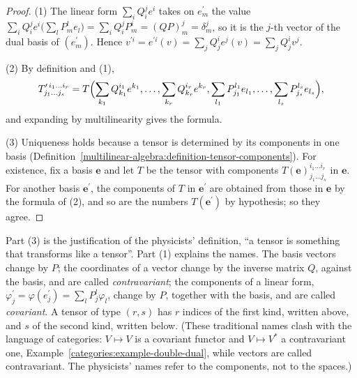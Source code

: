 \begin{proof}
(1) The linear form $\sum_iQ^j_ie^i$ takes on $e^{\prime}_m$ the value $\sum_iQ^j_ie^i\bigl(\sum_lP^l_me_l\bigr) = \sum_iQ^j_iP^i_m = (QP)^j_m = \delta^j_m$, so it is the $j$-th vector of the
dual basis of $(e^{\prime}_m)$. Hence $v^{\prime i} = e^{\prime i}(v) = \sum_jQ^i_je^j(v) = \sum_jQ^i_jv^j$.

(2) By definition and (1),
\[
T^{\prime\, i_1 \ldots i_r}_{j_1 \ldots j_s} = T\Bigl(\sum_{k_1}Q^{i_1}_{k_1}e^{k_1}, \ldots, \sum_{k_r}Q^{i_r}_{k_r}e^{k_r}, \sum_{l_1}P^{l_1}_{j_1}e_{l_1}, \ldots, \sum_{l_s}P^{l_s}_{j_s}e_{l_s}\Bigr),
\]
and expanding by multilinearity gives the formula.

(3) Uniqueness holds because a tensor is determined by its components in one basis (Definition~\ref{multilinear-algebra:definition-tensor-components}). For existence, fix a
basis $\mathbf{e}$ and let $T$ be the tensor with components $T(\mathbf{e})^{i_1 \ldots i_r}_{j_1 \ldots j_s}$ in $\mathbf{e}$. For another basis $\mathbf{e}^{\prime}$, the components of $T$ in
$\mathbf{e}^{\prime}$ are obtained from those in $\mathbf{e}$ by the formula of (2), and so are the numbers $T(\mathbf{e}^{\prime})$ by hypothesis; so they agree.
\end{proof}

Part (3) is the justification of the physicists' definition, ``a tensor is something that transforms like a tensor''. Part (1) explains the names. The basis vectors
change by $P$; the coordinates of a vector change by the inverse matrix $Q$, against the basis, and are called \emph{contravariant}; the components of a linear form,
$\varphi^{\prime}_j = \varphi(e^{\prime}_j) = \sum_lP^l_j\varphi_l$, change by $P$, together with the basis, and are called \emph{covariant}. A tensor of type $(r,s)$ has $r$ indices
of the first kind, written above, and $s$ of the second kind, written below. (These traditional names clash with the language of categories: $V \mapsto V$ is a covariant functor and
$V \mapsto V^*$ a contravariant one, Example~\ref{categories:example-double-dual}, while vectors are called contravariant. The physicists' names refer to the components, not to the
spaces.)

